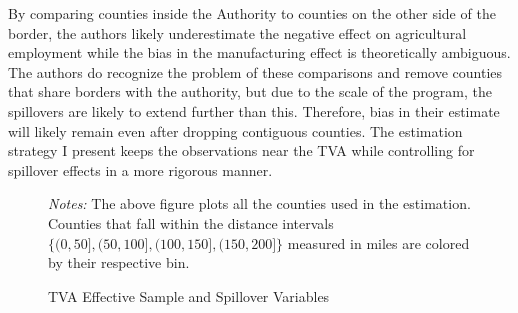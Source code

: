 \documentclass[11pt]{article}
\begin{document}
By comparing counties inside the Authority to counties on the other side of the border, the authors likely underestimate the negative effect on agricultural employment while the bias in the manufacturing effect is theoretically ambiguous. The authors do recognize the problem of these comparisons and remove counties that share borders with the authority, but due to the scale of the program, the spillovers are likely to extend further than this. Therefore, bias in their estimate will likely remain even after dropping contiguous counties. The estimation strategy I present keeps the observations near the TVA while controlling for spillover effects in a more rigorous manner.  

\begin{figure}[tb!]
    \caption{TVA Effective Sample and Spillover Variables}
    \label{fig:tva_sample}

    {\centering
    }
    {\footnotesize \textit{Notes:} The above figure plots all the counties used in the estimation. Counties that fall within the distance intervals $\{ (0, 50], (50, 100], (100, 150], (150, 200] \}$ measured in miles are colored by their respective bin.} 
\end{figure}
\end{document}
